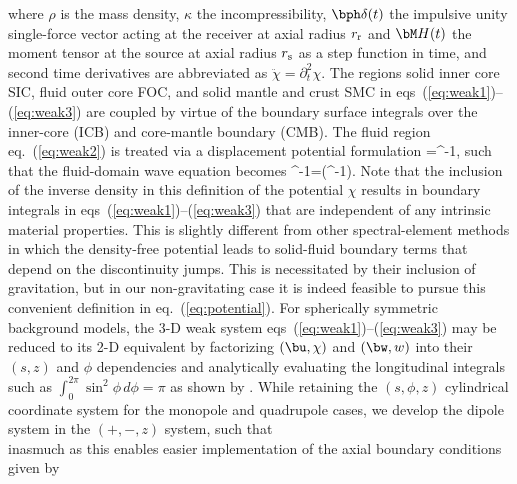\ena
%
where $\rho$ is the mass density, $\kappa$ the incompressibility, 
$\bph\delta(t)$ the impulsive unity single-force vector acting at the 
receiver at axial radius $r_{\rm r}$ and 
$\bM H(t)$ the moment tensor at the source at axial radius $r_{\rm s}$ as a 
step function in time, and second time derivatives are abbreviated as 
$\ddot{\chi}=\partial^2_t{\chi}$.
The regions solid inner core SIC, fluid outer core FOC, and solid mantle and 
crust SMC in eqs~(\ref{eq:weak1})--(\ref{eq:weak3}) are coupled by virtue of 
the boundary surface integrals over the inner-core (ICB) and core-mantle 
boundary (CMB). The fluid region eq.~(\ref{eq:weak2}) is treated via a 
displacement potential formulation \citep{nissen+:07a}
%
\eq\label{eq:potential}
\bu=\rho^{-1}\bdel\chi,
\en
%
such that the fluid-domain wave equation becomes
\eq\label{eq:fluid_waveequation}
\kappa^{-1}\ddot{\chi}=\bdel\cdot(\rho^{-1}\bdel\chi).
\en
%
Note that the inclusion
of the inverse density in this definition of the potential $\chi$ results in 
boundary integrals in eqs~(\ref{eq:weak1})--(\ref{eq:weak3}) that are 
independent of any intrinsic material properties.
This is slightly different from other spectral-element methods
\citep{KoTr02a,manu04} in which the density-free potential leads
to solid-fluid boundary terms that depend on the discontinuity jumps.
This is necessitated by their inclusion of gravitation, but in our 
non-gravitating case it is indeed feasible to pursue this convenient definition 
in eq.~(\ref{eq:potential}).
For spherically symmetric background models, the 3-D weak system 
eqs~(\ref{eq:weak1})--(\ref{eq:weak3}) may be reduced to its 2-D equivalent 
by factorizing $(\bu,\chi)$ and $(\bw,w)$ into their $(s,z)$ and $\phi$ 
dependencies and analytically evaluating the longitudinal integrals 
such as $\int_0^{2\pi}\sin^2{\phi}\,d\phi=\pi$ as shown by 
\citet[][Section~4.4]{nissen+:07a}.
%
While retaining the $(s,\phi,z)$ cylindrical coordinate
system for the monopole and quadrupole cases, we develop the dipole system 
in the $(+,-,z)$ system, such that
%
\eqa
{}\\
\ena
%
inasmuch as this enables easier implementation of 
the axial boundary conditions given by
\eqa 
{}
\ena
%

